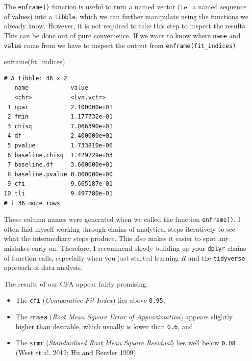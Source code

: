 \documentclass[
  letterpaper,
]{krantz}
\makeatletter
\newenvironment{Shaded}{\begin{snugshade}}{\end{snugshade}}
\newcommand{\FunctionTok}[1]{\textcolor[rgb]{0.28,0.35,0.67}{#1}}
\newcommand{\NormalTok}[1]{\textcolor[rgb]{0.00,0.23,0.31}{#1}}
\newenvironment{kframe}{%
\medskip{}
\setlength{\fboxsep}{.8em}
 \def\at@end@of@kframe{}%
 \ifinner\ifhmode%
  \def\at@end@of@kframe{\end{minipage}}%
  \begin{minipage}{\columnwidth}%
 \fi\fi%
 \def\FrameCommand##1{\hskip\@totalleftmargin \hskip-\fboxsep
 \colorbox{shadecolor}{##1}\hskip-\fboxsep
     \hskip-\linewidth \hskip-\@totalleftmargin \hskip\columnwidth}%
 \MakeFramed {\advance\hsize-\width
   \@totalleftmargin\z@ \linewidth\hsize
   \@setminipage}}%
 {\par\unskip\endMakeFramed%
 \at@end@of@kframe}
\renewenvironment{Shaded}{\begin{kframe}}{\end{kframe}}
\makeatother
\begin{document}
The \texttt{enframe()} function is useful to turn a named vector (i.e.~a
named sequence of values) into a \texttt{tibble}, which we can further
manipulate using the functions we already know. However, it is not
required to take this step to inspect the results. This can be done out
of pure convenience. If we want to know where \texttt{name} and
\texttt{value} came from we have to inspect the output from
\texttt{enframe(fit\_indices)}.

\begin{Shaded}
\begin{Highlighting}[]
\FunctionTok{enframe}\NormalTok{(fit\_indices)}
\end{Highlighting}
\end{Shaded}

\begin{verbatim}
# A tibble: 46 x 2
   name            value       
   <chr>           <lvn.vctr>  
 1 npar            2.100000e+01
 2 fmin            1.177732e-01
 3 chisq           7.066390e+01
 4 df              2.400000e+01
 5 pvalue          1.733810e-06
 6 baseline.chisq  1.429729e+03
 7 baseline.df     3.600000e+01
 8 baseline.pvalue 0.000000e+00
 9 cfi             9.665187e-01
10 tli             9.497780e-01
# i 36 more rows
\end{verbatim}

These column names were generated when we called the function
\texttt{enframe()}. I often find myself working through chains of
analytical steps iteratively to see what the intermediary steps produce.
This also makes it easier to spot any mistakes early on. Therefore, I
recommend slowly building up your \texttt{dplyr} chains of function
calls, especially when you just started learning \emph{R} and the
\texttt{tidyverse} approach of data analysis.

The results of our CFA appear fairly promising:

\begin{itemize}
\item
  The \texttt{cfi} (\emph{Comparative Fit Index}) lies above
  \texttt{0.95},
\item
  The \texttt{rmsea} (\emph{Root Mean Square Error of Approximation})
  appears slightly higher than desirable, which usually is lower than
  \texttt{0.6}, and
\item
  The \texttt{srmr} (\emph{Standardised Root Mean Square Residual}) lies
  well below \texttt{0.08} (West et al. 2012; Hu and Bentler 1999).
\end{itemize}
\end{document}
